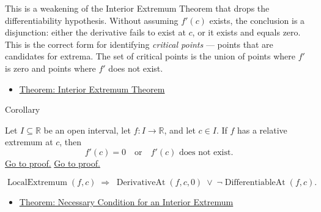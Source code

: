 \begin{remark*}[Interpretation]
This is a weakening of the Interior Extremum Theorem that drops the differentiability hypothesis. Without assuming $f'(c)$ exists, the conclusion is a disjunction: either the derivative fails to exist at $c$, or it exists and equals zero. This is the correct form for identifying \emph{critical points} --- points that are candidates for extrema. The set of critical points is the union of points where $f'$ is zero and points where $f'$ does not exist.
\end{remark*}

\begin{dependencies}
\begin{itemize}
  \item \hyperref[thm:interior-extremum-theorem]{Theorem: Interior Extremum Theorem}
\end{itemize}
\end{dependencies}


\begin{corollarybox}{Corollary}
\begin{corollary}
\label{cor:necessary-condition-extremum}
Let $I \subseteq \mathbb{R}$ be an open interval, let $f : I \to \mathbb{R}$, and let $c \in I$. If $f$ has a relative extremum at $c$, then
\[
f'(c) = 0 \quad \text{or} \quad f'(c) \text{ does not exist.}
\]
\hyperref[prf:relative-extremum-derivatives-equal-0-or-dont-exist]{Go to proof.}
\hyperref[prf:necessary-condition-extremum]{Go to proof.}
\end{corollary}
\end{corollarybox}

\begin{remark*}
\[
\operatorname{LocalExtremum}(f,c)
\;\Rightarrow\;
\operatorname{DerivativeAt}(f,c,0) \;\lor\; \lnot\operatorname{DifferentiableAt}(f,c).
\]
\end{remark*}

\begin{dependencies}
\begin{itemize}
  \item \hyperref[thm:necessary-condition-extremum]{Theorem: Necessary Condition for an Interior Extremum}
\end{itemize}
\end{dependencies}
